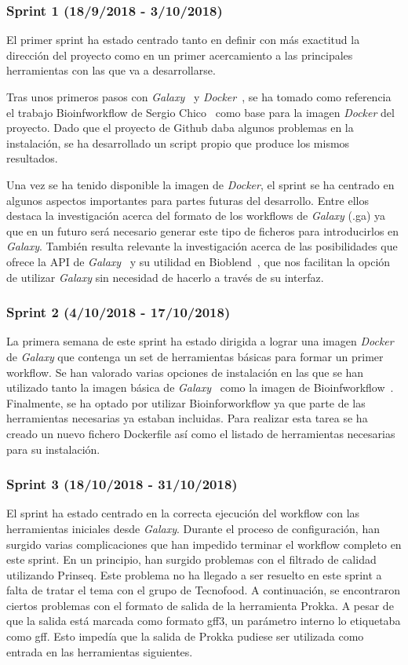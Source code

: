 \subsubsection{Sprint 1 (18/9/2018 - 3/10/2018)}
El primer sprint ha estado centrado tanto en definir con más exactitud la dirección del proyecto como en un primer acercamiento a las principales herramientas con las que va a desarrollarse. 

Tras unos primeros pasos con \textit{Galaxy}~\cite{1} y \textit{Docker}~\cite{2}, se ha tomado como referencia el trabajo Bioinfworkflow de Sergio Chico~\cite{3} como base para la imagen \textit{Docker} del proyecto. Dado que el proyecto de Github daba algunos problemas en la instalación, se ha desarrollado un script propio que produce los mismos resultados.

Una vez se ha tenido disponible la imagen de \textit{Docker}, el sprint se ha centrado en algunos aspectos importantes para partes futuras del desarrollo. Entre ellos destaca la investigación acerca del formato de los workflows de \textit{Galaxy} (.ga) ya que en un futuro será necesario generar este tipo de ficheros para introducirlos en \textit{Galaxy}. También resulta relevante la investigación acerca de las posibilidades que ofrece la API de \textit{Galaxy}~\cite{3} y su utilidad en Bioblend~\cite{4}, que nos facilitan la opción de utilizar \textit{Galaxy} sin necesidad de hacerlo a través de su interfaz.

\subsubsection{Sprint 2 (4/10/2018 - 17/10/2018)}
La primera semana de este sprint ha estado dirigida a lograr una imagen \textit{Docker} de \textit{Galaxy} que contenga un set de herramientas básicas para formar un primer workflow. Se han valorado varias opciones de instalación en las que se han utilizado tanto la imagen básica de \textit{Galaxy}~\cite{6} como la imagen de Bioinfworkflow~\cite{3}. Finalmente, se ha optado por utilizar Bioinforworkflow ya que parte de las herramientas necesarias ya estaban incluidas. 
Para realizar esta tarea se ha creado un nuevo fichero Dockerfile así como el listado de herramientas necesarias para su instalación.

\subsubsection{Sprint 3 (18/10/2018 - 31/10/2018)}
El sprint ha estado centrado en la correcta ejecución del workflow con las herramientas iniciales desde \textit{Galaxy}. Durante el proceso de configuración, han surgido varias complicaciones que han impedido terminar el workflow completo en este sprint. 
En un principio, han surgido problemas con el filtrado de calidad utilizando Prinseq. Este problema no ha llegado a ser resuelto en este sprint a falta de tratar el tema con el grupo de Tecnofood.
A continuación, se encontraron ciertos problemas con el formato de salida de la herramienta Prokka. A pesar de que la salida está marcada como formato gff3, un parámetro interno lo etiquetaba como gff. Esto impedía que la salida de Prokka pudiese ser utilizada como entrada en las herramientas siguientes.

